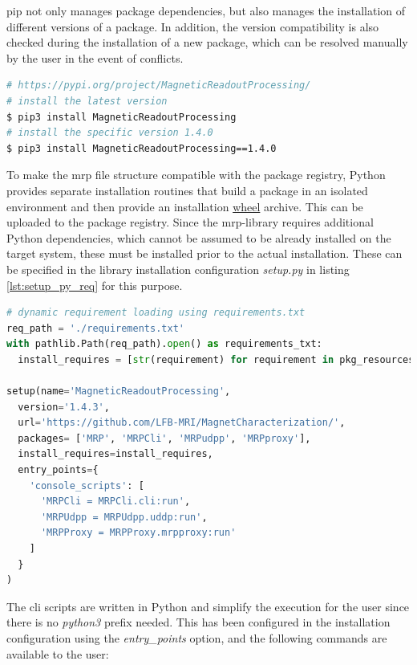 \gls{pip} not only manages package dependencies, but also manages the
installation of different versions of a package. In addition, the
version compatibility is also checked during the installation of a new
package, which can be resolved manually by the user in the event of
conflicts.

\begin{lstlisting}[language=bash, caption={Bash commands to install the MagneticReadoutProcessing library using pip}, label=lst:setup_lib_with_pip]
# https://pypi.org/project/MagneticReadoutProcessing/
# install the latest version
$ pip3 install MagneticReadoutProcessing
# install the specific version 1.4.0
$ pip3 install MagneticReadoutProcessing==1.4.0
\end{lstlisting}

To make the \gls{mrp} file structure compatible with the package
registry, Python provides separate installation routines that build a
package in an isolated environment and then provide an installation
\href{https://peps.python.org/pep-0427/}{wheel} archive. This can be
uploaded to the package registry. Since the \gls{mrp}-library requires
additional Python dependencies, which cannot be assumed to be already
installed on the target system, these must be installed prior to the
actual installation. These can be specified in the library installation
configuration \emph{setup.py} in listing \ref{lst:setup_py_req} for this
purpose.

\begin{lstlisting}[language=Python, caption={setup.py with dynamic requirement parsing using a given requirements.txt}, label=lst:setup_py_req]
# dynamic requirement loading using requirements.txt
req_path = './requirements.txt'
with pathlib.Path(req_path).open() as requirements_txt:
  install_requires = [str(requirement) for requirement in pkg_resources.parse_requirements(requirements_txt)]

setup(name='MagneticReadoutProcessing',
  version='1.4.3',
  url='https://github.com/LFB-MRI/MagnetCharacterization/',
  packages= ['MRP', 'MRPCli', 'MRPudpp', 'MRPproxy'],
  install_requires=install_requires,
  entry_points={
    'console_scripts': [
      'MRPCli = MRPCli.cli:run',
      'MRPUdpp = MRPUdpp.uddp:run',
      'MRPProxy = MRPProxy.mrpproxy:run'
    ]
  }
)
\end{lstlisting}

The \gls{cli} scripts are written in Python and simplify the execution
for the user since there is no \emph{python3} prefix needed. This has
been configured in the installation configuration using the
\emph{entry\_points} option, and the following commands are available to
the user:

